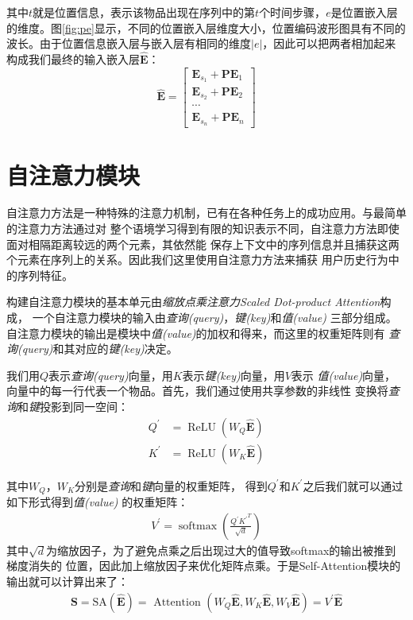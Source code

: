 其中$t$就是位置信息，表示该物品出现在序列中的第$t$个时间步骤，$e$是位置嵌入层的维度。图\ref{fig:pe}显示，不同的位置嵌入层维度大小，位置编码波形图具有不同的波长。由于位置信息嵌入层与嵌入层有相同的维度$|e|$，因此可以把两者相加起来构成我们最终的输入嵌入层$\widehat{\mathbf{E}}$：
\begin{equation}
	\label{fig:pe}
	\widehat{\mathbf{E}}=\left[ \begin{array}{c}{\mathbf{E}_{s_{1}}+\mathbf{PE}_{1}} \\ 
	{\mathbf{E}_{s_{2}}+\mathbf{PE}_{2}} \\ 
	\cdots \\
	{\mathbf{E}_{s_{n}}+\mathbf{PE}_{n}}\end{array}\right]
\end{equation}


\section{自注意力模块}

自注意力方法是一种特殊的注意力机制，已有在各种任务上的成功应用。与最简单的注意力方法通过对%
整个语境学习得到有限的知识表示不同，自注意力方法即使面对相隔距离较远的两个元素，其依然能%
保存上下文中的序列信息并且捕获这两个元素在序列上的关系。因此我们这里使用自注意力方法来捕获%
用户历史行为中的序列特征。

构建自注意力模块的基本单元由\textit{缩放点乘注意力Scaled Dot-product Attention}构成，%
一个自注意力模块的输入由\textit{查询(query)}，\textit{键(key)}和\textit{值(value)}%
三部分组成。自注意力模块的输出是模块中\textit{值(value)}的加权和得来，而这里的权重矩阵则有%
\textit{查询(query)}和其对应的\textit{键(key)}决定。

我们用$Q$表示\textit{查询(query)}向量，用$K$表示\textit{键(key)}向量，用$V$表示%
\textit{值(value)}向量，向量中的每一行代表一个物品。首先，我们通过使用共享参数的非线性%
变换将\textit{查询}和\textit{键}投影到同一空间：
\begin{align} 
	Q^{\prime} &=\operatorname{ReLU}(W_{Q}\widehat{\mathbf{E}}) \\ 
	K^{\prime} &=\operatorname{ReLU}(W_{K}\widehat{\mathbf{E}})
\end{align}

其中$W_{Q}$，$W_{K}$分别是\textit{查询}和\textit{键}向量的权重矩阵，%
得到$Q^{\prime}$和$K^{\prime}$之后我们就可以通过如下形式得到\textit{值(value)}%
的权重矩阵：
\begin{align} 
	V^{\prime}=\operatorname{softmax}(\frac{Q^{\prime} {K^{\prime}}^{T}}{\sqrt{d}})
\end{align}
其中$\sqrt{d}$为缩放因子，为了避免点乘之后出现过大的值导致softmax的输出被推到梯度消失的%
位置，因此加上缩放因子来优化矩阵点乘。于是Self-Attention模块的输出就可以计算出来了：
\begin{align} 
	\mathbf{S}=\mathrm{SA}(\widehat{\mathbf{E}})=\text { Attention }(W_{Q}\widehat{\mathbf{E}}, W_{K}\widehat{\mathbf{E}}, W_{V}\widehat{\mathbf{E}}) = V^{\prime}\widehat{\mathbf{E}}
\end{align}


